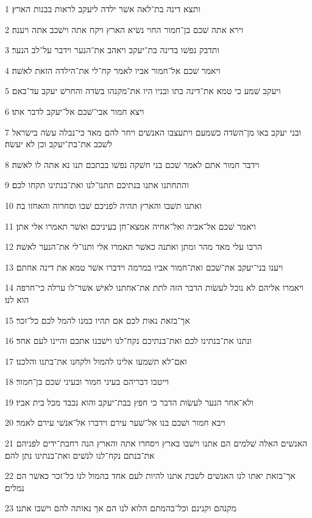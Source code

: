 \par 1 ותצא דינה בת־לאה אשׁר ילדה ליעקב לראות בבנות הארץ׃
\par 2 וירא אתה שׁכם בן־חמור החוי נשׂיא הארץ ויקח אתה וישׁכב אתה ויענה׃
\par 3 ותדבק נפשׁו בדינה בת־יעקב ויאהב את־הנער וידבר על־לב הנער׃
\par 4 ויאמר שׁכם אל־חמור אביו לאמר קח־לי את־הילדה הזאת לאשׁה׃
\par 5 ויעקב שׁמע כי טמא את־דינה בתו ובניו היו את־מקנהו בשׂדה והחרשׁ יעקב עד־באם׃
\par 6 ויצא חמור אבי־שׁכם אל־יעקב לדבר אתו׃
\par 7 ובני יעקב באו מן־השׂדה כשׁמעם ויתעצבו האנשׁים ויחר להם מאד כי־נבלה עשׂה בישׂראל לשׁכב את־בת־יעקב וכן לא יעשׂה׃
\par 8 וידבר חמור אתם לאמר שׁכם בני חשׁקה נפשׁו בבתכם תנו נא אתה לו לאשׁה׃
\par 9 והתחתנו אתנו בנתיכם תתנו־לנו ואת־בנתינו תקחו לכם׃
\par 10 ואתנו תשׁבו והארץ תהיה לפניכם שׁבו וסחרוה והאחזו בה׃
\par 11 ויאמר שׁכם אל־אביה ואל־אחיה אמצא־חן בעיניכם ואשׁר תאמרו אלי אתן׃
\par 12 הרבו עלי מאד מהר ומתן ואתנה כאשׁר תאמרו אלי ותנו־לי את־הנער לאשׁה׃
\par 13 ויענו בני־יעקב את־שׁכם ואת־חמור אביו במרמה וידברו אשׁר טמא את דינה אחתם׃
\par 14 ויאמרו אליהם לא נוכל לעשׂות הדבר הזה לתת את־אחתנו לאישׁ אשׁר־לו ערלה כי־חרפה הוא לנו׃
\par 15 אך־בזאת נאות לכם אם תהיו כמנו להמל לכם כל־זכר׃
\par 16 ונתנו את־בנתינו לכם ואת־בנתיכם נקח־לנו וישׁבנו אתכם והיינו לעם אחד׃
\par 17 ואם־לא תשׁמעו אלינו להמול ולקחנו את־בתנו והלכנו׃
\par 18 וייטבו דבריהם בעיני חמור ובעיני שׁכם בן־חמור׃
\par 19 ולא־אחר הנער לעשׂות הדבר כי חפץ בבת־יעקב והוא נכבד מכל בית אביו׃
\par 20 ויבא חמור ושׁכם בנו אל־שׁער עירם וידברו אל־אנשׁי עירם לאמר׃
\par 21 האנשׁים האלה שׁלמים הם אתנו וישׁבו בארץ ויסחרו אתה והארץ הנה רחבת־ידים לפניהם את־בנתם נקח־לנו לנשׁים ואת־בנתינו נתן להם׃
\par 22 אך־בזאת יאתו לנו האנשׁים לשׁבת אתנו להיות לעם אחד בהמול לנו כל־זכר כאשׁר הם נמלים׃
\par 23 מקנהם וקנינם וכל־בהמתם הלוא לנו הם אך נאותה להם וישׁבו אתנו׃
